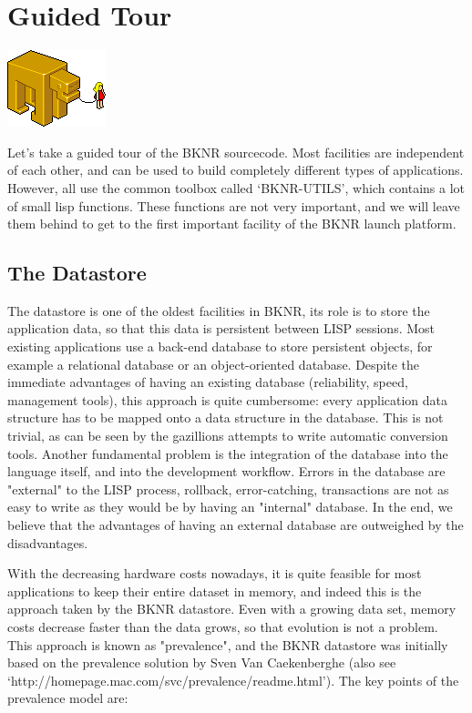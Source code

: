 \chapter{Guided Tour}

\vbox{
\centering
\includegraphics{guidedtouricon}
\vspace{1cm}
}

Let's take a guided tour of the BKNR sourcecode. Most facilities are
independent of each other, and can be used to build completely
different types of applications. However, all use the common toolbox
called `BKNR-UTILS', which contains a lot of small lisp
functions. These functions are not very important, and we will leave
them behind to get to the first important facility of the BKNR launch
platform.

\section{The Datastore}

The datastore is one of the oldest facilities in BKNR, its role is to
store the application data, so that this data is persistent between
LISP sessions. Most existing applications use a back-end
database to store persistent objects, for example a relational
database or an object-oriented database. Despite the immediate
advantages of having an existing database (reliability, speed,
management tools), this approach is quite cumbersome: every
application data structure has to be mapped onto a data structure in
the database. This is not trivial, as can be seen by the gazillions
attempts to write automatic conversion tools. Another fundamental
problem is the integration of the database into the language itself,
and into the development workflow. Errors in the database are
"external" to the LISP process, rollback, error-catching, transactions
are not as easy to write as they would be by having an "internal"
database. In the end, we believe that the advantages of having an
external database are outweighed by the disadvantages.

With the decreasing hardware costs nowadays, it is quite feasible for
most applications to keep their entire dataset in memory, and indeed
this is the approach taken by the BKNR datastore. Even with a growing
data set, memory costs decrease faster than the data grows, so that
evolution is not a problem. This approach is known as "prevalence",
and the BKNR datastore was initially based on the prevalence solution
by Sven Van Caekenberghe (also see
`http://homepage.mac.com/svc/prevalence/readme.html'). The key points
of the prevalence model are:

